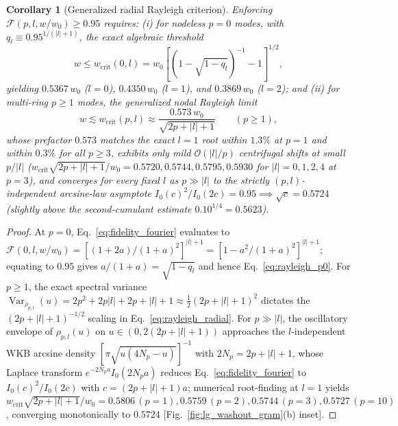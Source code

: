 \documentclass[aps,pra,reprint,nofootinbib,floatfix,longbibliography]{revtex4-2}
\newtheorem{corollary}{Corollary}
\theoremstyle{remark}
\newcommand{\abs}[1]{\lvert #1 \rvert}
\begin{document}
\begin{corollary}[Generalized radial Rayleigh criterion]
\label{cor:rayleigh_radial}
Enforcing $\mathcal{F}(p,l,w/w_0) \ge 0.95$ requires: (i) for nodeless $p = 0$ modes, with $q_l \equiv 0.95^{1/(\abs{l}+1)}$, the exact algebraic threshold
\begin{equation}
w \le w_{\mathrm{crit}}(0,l) = w_0 \left[\left(1 - \sqrt{1 - q_l}\right)^{-1} - 1\right]^{1/2},
\label{eq:rayleigh_p0}
\end{equation}
yielding $0.5367\,w_0$ ($l = 0$), $0.4350\,w_0$ ($l = 1$), and $0.3869\,w_0$ ($l = 2$); and (ii) for multi-ring $p \ge 1$ modes, the generalized nodal Rayleigh limit
\begin{equation}
w \lesssim w_{\mathrm{crit}}(p,l) \approx \frac{0.573\,w_0}{\sqrt{2p + \abs{l} + 1}} \qquad (p \ge 1),
\label{eq:rayleigh_radial}
\end{equation}
whose prefactor $0.573$ matches the exact $l = 1$ root within $1.3\%$ at $p = 1$ and within $0.3\%$ for all $p \ge 3$, exhibits only mild $\mathcal{O}(\abs{l}/p)$ centrifugal shifts at small $p/\abs{l}$ ($w_{\mathrm{crit}}\sqrt{2p+\abs{l}+1}/w_0 = 0.5720, 0.5744, 0.5795, 0.5930$ for $\abs{l} = 0,1,2,4$ at $p = 3$), and converges for every fixed $l$ as $p \gg \abs{l}$ to the strictly $(p,l)$-independent arcsine-law asymptote $I_0(c)^2/I_0(2c) = 0.95 \implies \sqrt{c} = 0.5724$ (slightly above the second-cumulant estimate $0.10^{1/4} = 0.5623$).
\end{corollary}
\begin{proof}
At $p = 0$, Eq.~\eqref{eq:fidelity_fourier} evaluates to $\mathcal{F}(0,l,w/w_0) = [(1+2a)/(1+a)^2]^{\abs{l}+1} = [1 - a^2/(1+a)^2]^{\abs{l}+1}$; equating to $0.95$ gives $a/(1+a) = \sqrt{1 - q_l}$ and hence Eq.~\eqref{eq:rayleigh_p0}. For $p \ge 1$, the exact spectral variance $\operatorname{Var}_{\rho_{p,l}}(u) = 2p^2 + 2p\abs{l} + 2p + \abs{l} + 1 \approx \frac{1}{2}(2p+\abs{l}+1)^2$ dictates the $(2p+\abs{l}+1)^{-1/2}$ scaling in Eq.~\eqref{eq:rayleigh_radial}. For $p \gg \abs{l}$, the oscillatory envelope of $\rho_{p,l}(u)$ on $u \in (0, 2(2p+\abs{l}+1))$ approaches the $l$-independent WKB arcsine density $[\pi\sqrt{u(4N_p-u)}]^{-1}$ with $2N_p = 2p+\abs{l}+1$, whose Laplace transform $e^{-2N_p a}I_0(2N_p a)$ reduces Eq.~\eqref{eq:fidelity_fourier} to $I_0(c)^2/I_0(2c)$ with $c = (2p+\abs{l}+1)a$; numerical root-finding at $l = 1$ yields $w_{\mathrm{crit}}\sqrt{2p+\abs{l}+1}/w_0 = 0.5806\,(p=1), 0.5759\,(p=2), 0.5744\,(p=3), 0.5727\,(p=10)$, converging monotonically to $0.5724$ [Fig.~\ref{fig:lg_washout_gram}(b) inset].
\end{proof}
\end{document}
